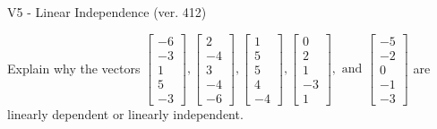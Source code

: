 \begin{exercise}
  \begin{exerciseTitle}V5 - Linear Independence (ver. 412)\end{exerciseTitle}
  \begin{exerciseStatement}
    Explain why the vectors \(\left[\begin{array}{r}
-6 \\
-3 \\
1 \\
5 \\
-3
\end{array}\right] , \left[\begin{array}{r}
2 \\
-4 \\
3 \\
-4 \\
-6
\end{array}\right] , \left[\begin{array}{r}
1 \\
5 \\
5 \\
4 \\
-4
\end{array}\right] , \left[\begin{array}{r}
0 \\
2 \\
1 \\
-3 \\
1
\end{array}\right] , \text{ and } \left[\begin{array}{r}
-5 \\
-2 \\
0 \\
-1 \\
-3
\end{array}\right]\) are linearly dependent or linearly independent.	



\end{exerciseStatement}
\end{exercise}
